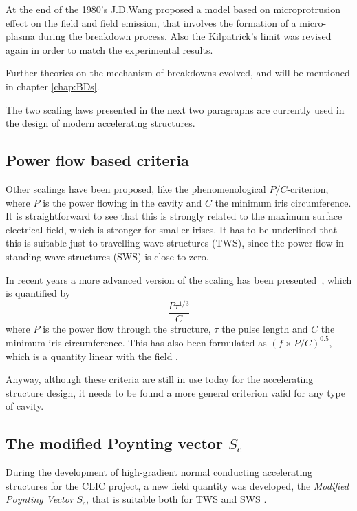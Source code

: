 At the end of the 1980's J.D.Wang proposed a model based on microprotrusion effect on the field and field emission, that involves the formation of a micro-plasma during the breakdown process. Also the Kilpatrick's limit was revised again in order to match the experimental results. \cite{Wang:1986, kilp:story}

Further theories on the mechanism of breakdowns evolved, and will be mentioned in chapter \ref{chap:BDs}.

The two scaling laws presented in the next two paragraphs are currently used in the design of modern accelerating structures.

\subsection[Power flow based criteria]{Power flow based criteria}

Other scalings have been proposed, like the phenomenological $P/C$-criterion, where $P$ is the power flowing in the cavity and $C$ the minimum iris circumference. It is straightforward to see that this is strongly related to the maximum surface electrical field, which is stronger for smaller irises. It has to be underlined that this is suitable just to travelling wave structures (TWS), since the power flow in standing wave structures (SWS) is close to zero. 

In recent years a more advanced version of the scaling has been presented~\cite{Wuensch:932674}, which is quantified by
\begin{equation}
\frac{P \tau^{1/3}}{C}
\end{equation}
where $P$ is the power flow through the structure, $\tau$ the pulse length and $C$ the minimum iris circumference. This has also been formulated as $(f \times P/C )^{0.5}$, which is a quantity linear with the field \cite{Wuensch:advaces}.

Anyway, although these criteria are still in use today for the accelerating structure design, it needs to be found a more general criterion valid for any type of cavity.

\subsection{The modified Poynting vector $S_c$}

During the development of high-gradient normal conducting accelerating structures for the CLIC project, a new field quantity was developed, the \textit{Modified Poynting Vector} $S_c$, that is suitable both for TWS and SWS \cite{Grudiev:newLoc}.

